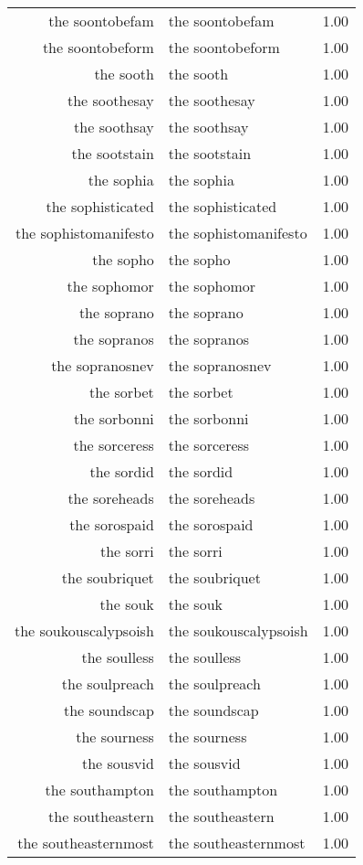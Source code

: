 \begin{table}[ht]
\begin{tabular}{rlr}
  the soontobefam & the soontobefam & 1.00 \\ 
  the soontobeform & the soontobeform & 1.00 \\ 
  the sooth & the sooth & 1.00 \\ 
  the soothesay & the soothesay & 1.00 \\ 
  the soothsay & the soothsay & 1.00 \\ 
  the sootstain & the sootstain & 1.00 \\ 
  the sophia & the sophia & 1.00 \\ 
  the sophisticated & the sophisticated & 1.00 \\ 
  the sophistomanifesto & the sophistomanifesto & 1.00 \\ 
  the sopho & the sopho & 1.00 \\ 
  the sophomor & the sophomor & 1.00 \\ 
  the soprano & the soprano & 1.00 \\ 
  the sopranos & the sopranos & 1.00 \\ 
  the sopranosnev & the sopranosnev & 1.00 \\ 
  the sorbet & the sorbet & 1.00 \\ 
  the sorbonni & the sorbonni & 1.00 \\ 
  the sorceress & the sorceress & 1.00 \\ 
  the sordid & the sordid & 1.00 \\ 
  the soreheads & the soreheads & 1.00 \\ 
  the sorospaid & the sorospaid & 1.00 \\ 
  the sorri & the sorri & 1.00 \\ 
  the soubriquet & the soubriquet & 1.00 \\ 
  the souk & the souk & 1.00 \\ 
  the soukouscalypsoish & the soukouscalypsoish & 1.00 \\ 
  the soulless & the soulless & 1.00 \\ 
  the soulpreach & the soulpreach & 1.00 \\ 
  the soundscap & the soundscap & 1.00 \\ 
  the sourness & the sourness & 1.00 \\ 
  the sousvid & the sousvid & 1.00 \\ 
  the southampton & the southampton & 1.00 \\ 
  the southeastern & the southeastern & 1.00 \\ 
  the southeasternmost & the southeasternmost & 1.00 \\ 

\end{tabular}
\end{table}
